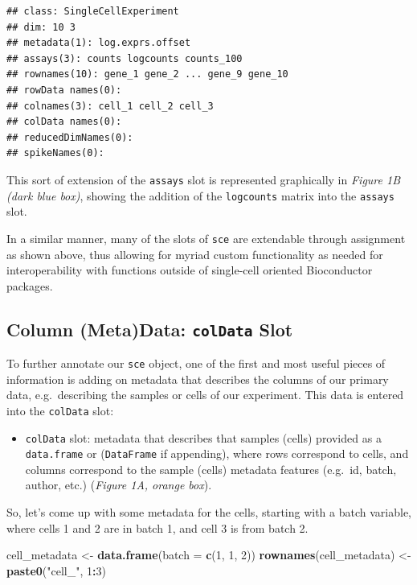 \documentclass[]{book}
\newenvironment{Shaded}{\begin{snugshade}}{\end{snugshade}}
\newcommand{\DataTypeTok}[1]{\textcolor[rgb]{0.13,0.29,0.53}{#1}}
\newcommand{\DecValTok}[1]{\textcolor[rgb]{0.00,0.00,0.81}{#1}}
\newcommand{\KeywordTok}[1]{\textcolor[rgb]{0.13,0.29,0.53}{\textbf{#1}}}
\newcommand{\NormalTok}[1]{#1}
\newcommand{\OperatorTok}[1]{\textcolor[rgb]{0.81,0.36,0.00}{\textbf{#1}}}
\newcommand{\StringTok}[1]{\textcolor[rgb]{0.31,0.60,0.02}{#1}}
\providecommand{\tightlist}{%
  \setlength{\itemsep}{0pt}\setlength{\parskip}{0pt}}
\begin{document}
\begin{verbatim}
## class: SingleCellExperiment 
## dim: 10 3 
## metadata(1): log.exprs.offset
## assays(3): counts logcounts counts_100
## rownames(10): gene_1 gene_2 ... gene_9 gene_10
## rowData names(0):
## colnames(3): cell_1 cell_2 cell_3
## colData names(0):
## reducedDimNames(0):
## spikeNames(0):
\end{verbatim}

This sort of extension of the \texttt{assays} slot is represented graphically in \emph{Figure 1B (dark blue box)}, showing the addition of the \texttt{logcounts} matrix into the \texttt{assays} slot.

In a similar manner, many of the slots of \texttt{sce} are extendable through assignment as shown above, thus allowing for myriad custom functionality as needed for interoperability with functions outside of single-cell oriented Bioconductor packages.

\hypertarget{column-metadata-coldata-slot}{%
\subsection{\texorpdfstring{Column (Meta)Data: \texttt{colData} Slot}{Column (Meta)Data: colData Slot}}\label{column-metadata-coldata-slot}}

To further annotate our \texttt{sce} object, one of the first and most useful pieces of information is adding on metadata that describes the columns of our primary data, e.g.~describing the samples or cells of our experiment. This data is entered into the \texttt{colData} slot:

\begin{itemize}
\tightlist
\item
  \texttt{colData} slot: metadata that describes that samples (cells) provided as a \texttt{data.frame} or (\texttt{DataFrame} if appending), where rows correspond to cells, and columns correspond to the sample (cells) metadata features (e.g.~id, batch, author, etc.) (\emph{Figure 1A, orange box}).
\end{itemize}

So, let's come up with some metadata for the cells, starting with a batch variable, where cells 1 and 2 are in batch 1, and cell 3 is from batch 2.

\begin{Shaded}
\begin{Highlighting}[]
\NormalTok{cell_metadata <-}\StringTok{ }\KeywordTok{data.frame}\NormalTok{(}\DataTypeTok{batch =} \KeywordTok{c}\NormalTok{(}\DecValTok{1}\NormalTok{, }\DecValTok{1}\NormalTok{, }\DecValTok{2}\NormalTok{))}
\KeywordTok{rownames}\NormalTok{(cell_metadata) <-}\StringTok{ }\KeywordTok{paste0}\NormalTok{(}\StringTok{"cell_"}\NormalTok{, }\DecValTok{1}\OperatorTok{:}\DecValTok{3}\NormalTok{)}
\end{Highlighting}
\end{Shaded}
\end{document}
